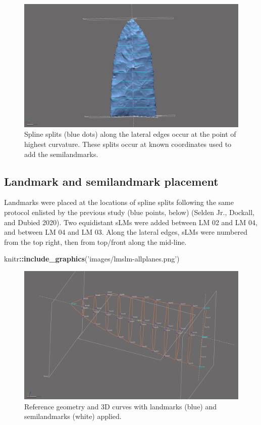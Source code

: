 \documentclass[
]{article}
\newenvironment{Shaded}{\begin{snugshade}}{\end{snugshade}}
\newcommand{\KeywordTok}[1]{\textcolor[rgb]{0.13,0.29,0.53}{\textbf{#1}}}
\newcommand{\NormalTok}[1]{#1}
\newcommand{\OperatorTok}[1]{\textcolor[rgb]{0.81,0.36,0.00}{\textbf{#1}}}
\newcommand{\StringTok}[1]{\textcolor[rgb]{0.31,0.60,0.02}{#1}}
\begin{document}
\begin{figure}
\includegraphics[width=1\linewidth]{images/pt.high.curv.split} \caption{Spline splits (blue dots) along the lateral edges occur at the point of highest curvature. These splits occur at known coordinates used to add the semilandmarks.}\label{fig:pt.high.curv.split}
\end{figure}

\hypertarget{landmark-and-semilandmark-placement}{%
\subsection{Landmark and semilandmark
placement}\label{landmark-and-semilandmark-placement}}

Landmarks were placed at the locations of spline splits following the
same protocol enlisted by the previous study (blue points, below)
(Selden Jr., Dockall, and Dubied 2020). Two equidistant sLMs were added
between LM 02 and LM 04, and between LM 04 and LM 03. Along the lateral
edges, sLMs were numbered from the top right, then from top/front along
the mid-line.

\begin{Shaded}
\begin{Highlighting}[]
\NormalTok{knitr}\OperatorTok{::}\KeywordTok{include_graphics}\NormalTok{(}\StringTok{'images/lmslm-allplanes.png'}\NormalTok{)}
\end{Highlighting}
\end{Shaded}

\begin{figure}
\includegraphics[width=1\linewidth]{images/lmslm-allplanes} \caption{Reference geometry and 3D curves with landmarks (blue) and semilandmarks (white) applied.}\label{fig:figlmslm-all}
\end{figure}
\end{document}
